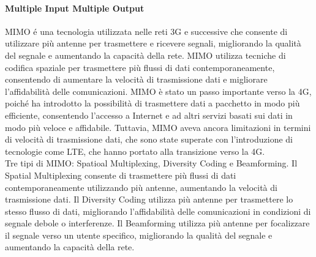 \paragraph{Multiple Input Multiple Output}
MIMO é una tecnologia utilizzata nelle reti 3G e successive che consente di utilizzare più antenne per trasmettere e ricevere segnali, migliorando la qualità del segnale e aumentando la capacità della rete. MIMO utilizza tecniche di codifica spaziale per trasmettere più flussi di dati contemporaneamente, consentendo di aumentare la velocità di trasmissione dati e migliorare l'affidabilità delle comunicazioni. MIMO è stato un passo importante verso la 4G, poiché ha introdotto la possibilità di trasmettere dati a pacchetto in modo più efficiente, consentendo l'accesso a Internet e ad altri servizi basati sui dati in modo più veloce e affidabile. Tuttavia, MIMO aveva ancora limitazioni in termini di velocità di trasmissione dati, che sono state superate con l'introduzione di tecnologie come LTE, che hanno portato alla transizione verso la 4G.\\
Tre tipi di MIMO: Spatioal Multiplexing, Diversity Coding e Beamforming. Il Spatial Multiplexing consente di trasmettere più flussi di dati contemporaneamente utilizzando più antenne, aumentando la velocità di trasmissione dati. Il Diversity Coding utilizza più antenne per trasmettere lo stesso flusso di dati, migliorando l'affidabilità delle comunicazioni in condizioni di segnale debole o interferenze. Il Beamforming utilizza più antenne per focalizzare il segnale verso un utente specifico, migliorando la qualità del segnale e aumentando la capacità della rete.\\

